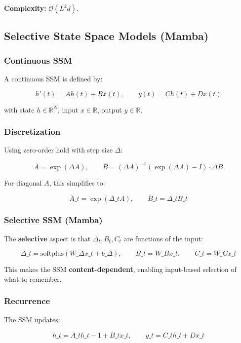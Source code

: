 \textbf{Complexity:} $\mathcal{O}(L^2 d)$.

\subsection{Selective State Space Models (Mamba)}

\subsubsection{Continuous SSM}

A continuous SSM is defined by:

\[
h'(t) = A h(t) + B x(t), \qquad
y(t) = C h(t) + D x(t)
\tag{3.4}
\]

with state $h \in \mathbb{R}^N$, input $x \in \mathbb{R}$, output $y \in \mathbb{R}$.

\subsubsection{Discretization}

Using zero-order hold with step size $\Delta$:

\[
\bar{A} = \exp(\Delta A), \qquad
\bar{B} = (\Delta A)^{-1} (\exp(\Delta A) - I) \cdot \Delta B
\tag{3.5}
\]

For diagonal $A$, this simplifies to:

\[
\bar{A}\_t = \exp(\Delta\_t A), \qquad
\bar{B}\_t = \Delta\_t B\_t
\tag{3.6}
\]

\subsubsection{Selective SSM (Mamba)}

The \textbf{selective} aspect is that $\Delta_t, B_t, C_t$ are functions of the 
input:

\[
\Delta\_t = \text{softplus}(W\_\Delta x\_t + b\_\Delta), \qquad
B\_t = W\_B x\_t, \qquad
C\_t = W\_C x\_t
\tag{3.7}
\]

This makes the SSM \textbf{content-dependent}, enabling input-based selection 
of what to remember.

\subsubsection{Recurrence}

The SSM updates:

\[
h\_t = \bar{A}\_t h\_{t-1} + \bar{B}\_t x\_t, \qquad
y\_t = C\_t h\_t + D x\_t
\tag{3.8}
\]

